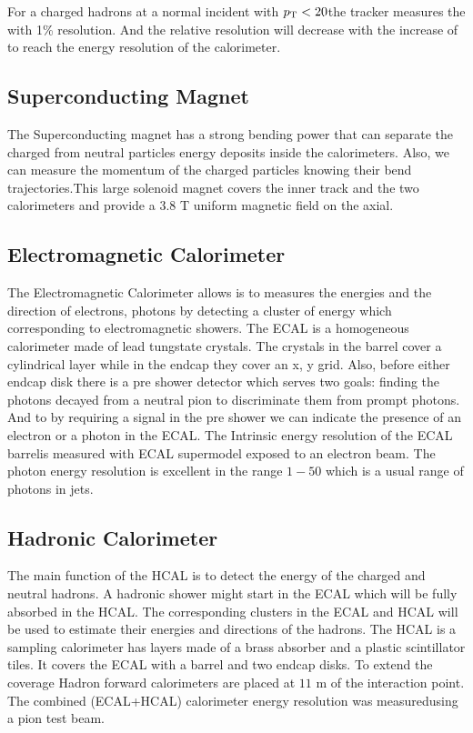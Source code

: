 For a charged hadrons at a normal incident with $p_{\mathrm{T}} < 20$\GeV the tracker measures the \pt with 1\% resolution. And the relative resolution will decrease with the increase of \pt to reach the energy resolution of the calorimeter.

\subsection{Superconducting Magnet}

The Superconducting magnet has a strong bending power that can separate the charged from neutral particles energy deposits inside the calorimeters. Also, we can measure the momentum of the charged particles knowing their bend trajectories.This large solenoid magnet covers the inner track and the two calorimeters and provide a $3.8$ T uniform magnetic field on the axial.  

\subsection{Electromagnetic Calorimeter}

The Electromagnetic Calorimeter allows is to measures the energies and the direction of electrons, photons by detecting a cluster of energy which corresponding to electromagnetic showers. The ECAL is a homogeneous calorimeter made of lead tungstate crystals. The crystals in the barrel cover a cylindrical layer while in the endcap they cover an x, y grid. Also, before either endcap disk there is a pre shower detector which serves two goals: finding the photons decayed from a neutral pion to discriminate them from prompt photons. And to by requiring a signal in the pre shower we can indicate the presence of an electron or a photon in the ECAL. The Intrinsic energy resolution of the ECAL barrelis measured with ECAL supermodel exposed to an electron beam. The photon energy resolution is excellent in the range $1-50$ \GeV which is a usual range of photons in jets.  
 

\subsection{Hadronic Calorimeter}

The main function of the HCAL is to detect the energy of the charged and neutral hadrons. A hadronic shower might start in the ECAL which will be fully absorbed in the HCAL. The corresponding clusters in the ECAL and  HCAL will be used to estimate their energies and directions of the hadrons. The HCAL is a sampling calorimeter has layers made of a brass absorber and a plastic scintillator tiles. It covers the ECAL with a barrel and two endcap disks. To extend the coverage Hadron forward calorimeters are placed at $11$ m of the interaction point. The combined (ECAL+HCAL) calorimeter energy resolution was measuredusing a pion test beam. 
 




